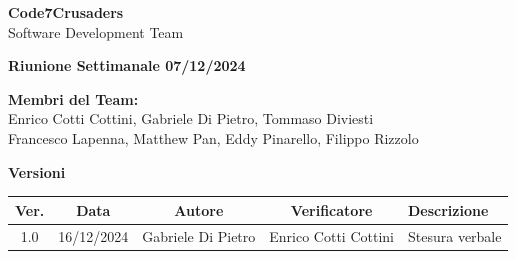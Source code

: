 \documentclass{article}
\begin{document}
\begin{titlepage}
    {\Huge \textbf{Code7Crusaders}}\\
    \vspace{0.5cm}
    {\Large Software Development Team}\\
    \vspace{2cm}
    
    {\large \textbf{Riunione Settimanale 07/12/2024}}\\ 
    \vspace{5cm}                           
    
    
    \textbf{Membri del Team:}\\
    Enrico Cotti Cottini, Gabriele Di Pietro, Tommaso Diviesti \\
    Francesco Lapenna, Matthew Pan, Eddy Pinarello, Filippo Rizzolo \\
    \vspace{0.5cm}
    
    \vspace{1cm}
\end{titlepage}



\newpage
\begin{table}[h!]
\centering
\textbf{Versioni} \\ %
\vspace{2mm} %
\begin{tabular}{|c|c|c|c|>{\raggedright\arraybackslash}p{}|}
    \hline
    \textbf{Ver.} & \textbf{Data} & \textbf{Autore} & \textbf{Verificatore} & \textbf{Descrizione} \\
    \hline
    1.0 & 16/12/2024 & Gabriele Di Pietro & Enrico Cotti Cottini & Stesura verbale \\ 
    \hline                                  
\end{tabular}
\end{table}



\newpage
\tableofcontents



\newpage
\end{document}
